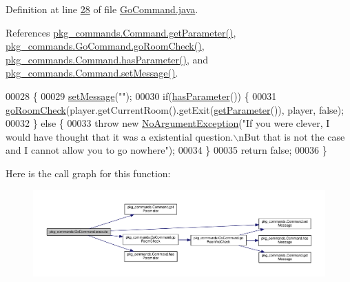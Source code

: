 Definition at line \hyperlink{GoCommand_8java_source_l00028}{28} of file \hyperlink{GoCommand_8java_source}{Go\-Command.\-java}.



References \hyperlink{Command_8java_source_l00034}{pkg\-\_\-commands.\-Command.\-get\-Parameter()}, \hyperlink{GoCommand_8java_source_l00046}{pkg\-\_\-commands.\-Go\-Command.\-go\-Room\-Check()}, \hyperlink{Command_8java_source_l00050}{pkg\-\_\-commands.\-Command.\-has\-Parameter()}, and \hyperlink{Command_8java_source_l00058}{pkg\-\_\-commands.\-Command.\-set\-Message()}.


\begin{DoxyCode}
00028                                                                                                            
                              \{
00029         \hyperlink{classpkg__commands_1_1Command_ae210ff216fe908b111ba1c988a963d13}{setMessage}(\textcolor{stringliteral}{""});
00030         \textcolor{keywordflow}{if}(\hyperlink{classpkg__commands_1_1Command_a02af95ab3f1898a66259ab7c177b6998}{hasParameter}()) \{
00031             \hyperlink{classpkg__commands_1_1GoCommand_acbf1aa81fa5b1aef7cafb8b4e3ace3a9}{goRoomCheck}(player.getCurrentRoom().getExit(\hyperlink{classpkg__commands_1_1Command_a41c92d445be73ea9d62320c65efb8434}{getParameter}()), player, \textcolor{keyword}{
      false});
00032         \} \textcolor{keywordflow}{else} \{
00033             \textcolor{keywordflow}{throw} \textcolor{keyword}{new} \hyperlink{classpkg__exceptions_1_1NoArgumentException}{NoArgumentException}(\textcolor{stringliteral}{"If you were clever, I would have thought that
       it was a existential question.\(\backslash\)nBut that is not the case and I cannot allow you to go nowhere"});
00034         \}
00035         \textcolor{keywordflow}{return} \textcolor{keyword}{false};
00036     \}
\end{DoxyCode}


Here is the call graph for this function\-:\nopagebreak
\begin{figure}[H]
\begin{center}
\leavevmode
\includegraphics[width=350pt]{classpkg__commands_1_1GoCommand_a82e9a64a0fac612f788060a90c83f9b1_cgraph}
\end{center}
\end{figure}



